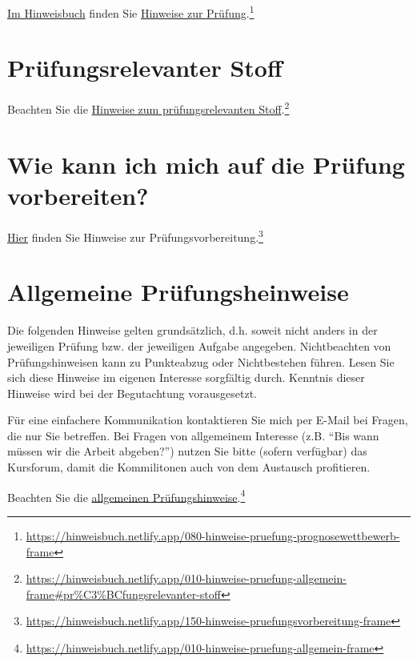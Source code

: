 \documentclass[
  a4paper,
]{scrbook}
\theoremstyle{definition}
\theoremstyle{definition}
\theoremstyle{definition}
\theoremstyle{remark}
\begin{document}
\href{https://hinweisbuch.netlify.app/}{Im Hinweisbuch} finden Sie
\href{https://hinweisbuch.netlify.app/080-hinweise-pruefung-prognosewettbewerb-frame}{Hinweise
zur Prüfung}.\footnote{\url{https://hinweisbuch.netlify.app/080-hinweise-pruefung-prognosewettbewerb-frame}}

\section{Prüfungsrelevanter Stoff}\label{pruxfcfungsrelevanter-stoff-1}

Beachten Sie die
\href{https://hinweisbuch.netlify.app/010-hinweise-pruefung-allgemein-frame\#pr\%C3\%BCfungsrelevanter-stoff}{Hinweise
zum prüfungsrelevanten Stoff}.\footnote{\url{https://hinweisbuch.netlify.app/010-hinweise-pruefung-allgemein-frame\#pr\%C3\%BCfungsrelevanter-stoff}}

\section{Wie kann ich mich auf die Prüfung
vorbereiten?}\label{wie-kann-ich-mich-auf-die-pruxfcfung-vorbereiten-1}

\href{https://hinweisbuch.netlify.app/150-hinweise-pruefungsvorbereitung-frame}{Hier}
finden Sie Hinweise zur Prüfungsvorbereitung.\footnote{\url{https://hinweisbuch.netlify.app/150-hinweise-pruefungsvorbereitung-frame}}

\section{Allgemeine
Prüfungsheinweise}\label{allgemeine-pruxfcfungsheinweise}

Die folgenden Hinweise gelten grundsätzlich, d.h. soweit nicht anders in
der jeweiligen Prüfung bzw. der jeweiligen Aufgabe angegeben.
Nichtbeachten von Prüfungshinweisen kann zu Punkteabzug oder
Nichtbestehen führen. Lesen Sie sich diese Hinweise im eigenen Interesse
sorgfältig durch. Kenntnis dieser Hinweise wird bei der Begutachtung
vorausgesetzt.

Für eine einfachere Kommunikation kontaktieren Sie mich per E-Mail bei
Fragen, die nur Sie betreffen. Bei Fragen von allgemeinem Interesse
(z.B. ``Bis wann müssen wir die Arbeit abgeben?'') nutzen Sie bitte
(sofern verfügbar) das Kursforum, damit die Kommilitonen auch von dem
Austausch profitieren.

Beachten Sie die
\href{https://hinweisbuch.netlify.app/010-hinweise-pruefung-allgemein-frame}{allgemeinen
Prüfungshinweise}.\footnote{\url{https://hinweisbuch.netlify.app/010-hinweise-pruefung-allgemein-frame}}
\end{document}
